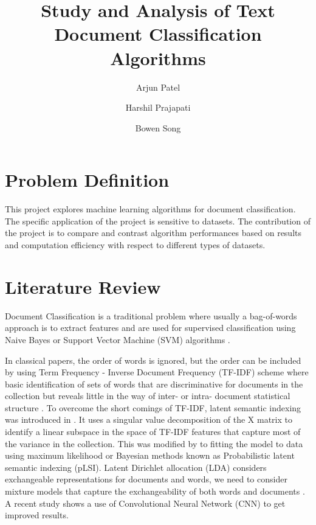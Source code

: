 \documentclass[10pt,twocolumn,letterpaper]{article}
\begin{document}
\title{Study and Analysis of Text Document Classification Algorithms}
\author[1]{Arjun Patel}
\author[1]{Harshil Prajapati}
\author[1]{Bowen Song}

\maketitle

\section{Problem Definition}
   This project explores machine learning algorithms for document classification. The specific application of the project is sensitive to datasets. The contribution of the project is to compare and contrast algorithm performances based on results and computation efficiency with respect to different types of datasets.


\section{Literature Review}
 Document Classification is a traditional problem where usually a bag-of-words approach is to extract features and are used for supervised classification using Naive Bayes or Support Vector Machine (SVM) algorithms \cite{sachan2018investigating}. 

In classical papers, the order of words is ignored, but the order can be included by using Term Frequency - Inverse Document Frequency (TF-IDF) scheme where basic identification of sets of words that are discriminative for documents in the collection but reveals little in the way of inter- or intra- document statistical structure \cite{maes1995agents}. To overcome the short comings of TF-IDF, latent semantic indexing was introduced in \cite{deerwester1990indexing}. It uses a singular value decomposition of the X matrix to identify a linear subspace in the space of TF-IDF features that capture most of the variance in the collection. This was modified by \cite{hofmann1999probabilistic} to fitting the model to data using maximum likelihood or Bayesian methods known as Probabilistic latent semantic indexing (pLSI). Latent Dirichlet allocation (LDA) considers exchangeable representations for documents and words, we need to consider mixture models that capture the exchangeability of both words and documents \cite{blei2003latent}. A recent study shows a use of Convolutional Neural Network (CNN) \cite{kim2014convolutional} to get improved results. 
\end{document}
